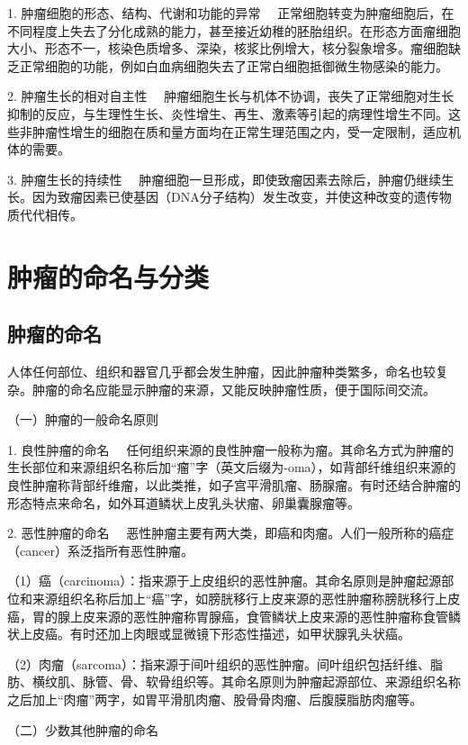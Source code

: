 {1. 肿瘤细胞的形态、结构、代谢和功能的异常}
　正常细胞转变为肿瘤细胞后，在不同程度上失去了分化成熟的能力，甚至接近幼稚的胚胎组织。在形态方面瘤细胞大小、形态不一，核染色质增多、深染，核浆比例增大，核分裂象增多。瘤细胞缺乏正常细胞的功能，例如白血病细胞失去了正常白细胞抵御微生物感染的能力。

{2. 肿瘤生长的相对自主性}
　肿瘤细胞生长与机体不协调，丧失了正常细胞对生长抑制的反应，与生理性生长、炎性增生、再生、激素等引起的病理性增生不同。这些非肿瘤性增生的细胞在质和量方面均在正常生理范围之内，受一定限制，适应机体的需要。

{3. 肿瘤生长的持续性}
　肿瘤细胞一旦形成，即使致瘤因素去除后，肿瘤仍继续生长。因为致瘤因素已使基因（DNA分子结构）发生改变，并使这种改变的遗传物质代代相传。

\section{肿瘤的命名与分类}

\subsection{肿瘤的命名}

人体任何部位、组织和器官几乎都会发生肿瘤，因此肿瘤种类繁多，命名也较复杂。肿瘤的命名应能显示肿瘤的来源，又能反映肿瘤性质，便于国际间交流。

{（一）肿瘤的一般命名原则}

{1. 良性肿瘤的命名}
　任何组织来源的良性肿瘤一般称为瘤。其命名方式为肿瘤的生长部位和来源组织名称后加“瘤”字（英文后缀为-oma），如背部纤维组织来源的良性肿瘤称背部纤维瘤，以此类推，如子宫平滑肌瘤、肠腺瘤。有时还结合肿瘤的形态特点来命名，如外耳道鳞状上皮乳头状瘤、卵巢囊腺瘤等。

{2. 恶性肿瘤的命名}
　恶性肿瘤主要有两大类，即癌和肉瘤。人们一般所称的癌症（cancer）系泛指所有恶性肿瘤。

（1）癌（carcinoma）：指来源于上皮组织的恶性肿瘤。其命名原则是肿瘤起源部位和来源组织名称后加上“癌”字，如膀胱移行上皮来源的恶性肿瘤称膀胱移行上皮癌，胃的腺上皮来源的恶性肿瘤称胃腺癌，食管鳞状上皮来源的恶性肿瘤称食管鳞状上皮癌。有时还加上肉眼或显微镜下形态性描述，如甲状腺乳头状癌。

（2）肉瘤（sarcoma）：指来源于间叶组织的恶性肿瘤。间叶组织包括纤维、脂肪、横纹肌、脉管、骨、软骨组织等。其命名原则为肿瘤起源部位、来源组织名称之后加上“肉瘤”两字，如胃平滑肌肉瘤、股骨骨肉瘤、后腹膜脂肪肉瘤等。

{（二）少数其他肿瘤的命名}

